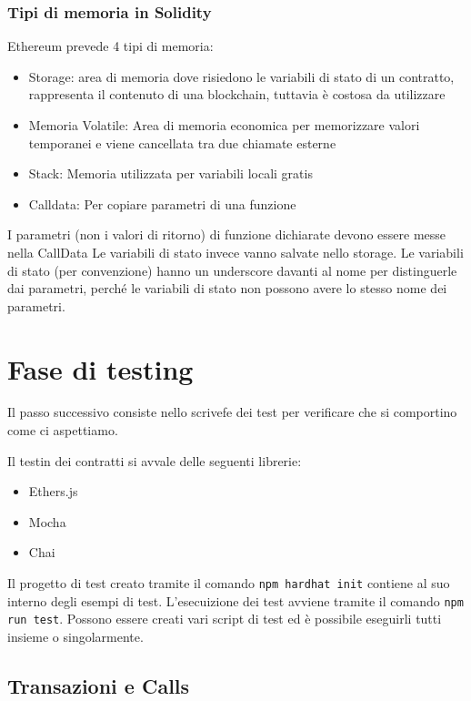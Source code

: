 \documentclass[a4paper]{article}
\begin{document}
\subsubsection{Tipi di memoria in Solidity}

Ethereum prevede 4 tipi di memoria:
\begin{itemize}
    \item Storage: area di memoria dove risiedono le variabili di stato di un contratto, rappresenta il contenuto di una blockchain, tuttavia è costosa da utilizzare
    \item Memoria Volatile: Area di memoria economica per memorizzare valori temporanei e viene cancellata tra due chiamate esterne
    \item Stack: Memoria utilizzata per variabili locali gratis
    \item Calldata: Per copiare parametri di una funzione
\end{itemize}
I parametri (non i valori di ritorno) di funzione dichiarate devono essere messe nella CallData
Le variabili di stato invece vanno salvate nello storage.
Le variabili di stato (per convenzione) hanno un underscore davanti al nome per distinguerle dai parametri, perché le variabili di stato non possono avere lo stesso nome dei parametri.

\section{Fase di testing}

Il passo successivo consiste nello scrivefe dei test per verificare che si comportino come ci aspettiamo.

Il testin dei contratti si avvale delle seguenti librerie:
\begin{itemize}
    \item Ethers.js
    \item Mocha
    \item Chai
\end{itemize}
Il progetto di test creato tramite il comando \texttt{npm hardhat init} contiene al suo interno degli esempi di test.
L'esecuizione dei test avviene tramite il comando \texttt{npm run test}. Possono essere creati vari script di test ed è possibile eseguirli tutti insieme o singolarmente.

\subsection{Transazioni e Calls}
\end{document}
